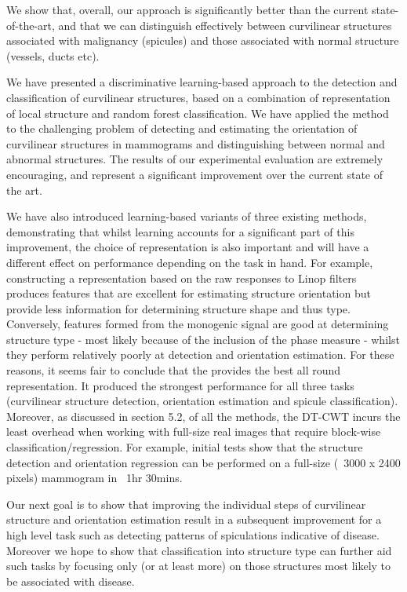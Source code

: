 We show that, overall, our approach is significantly better than the current state-of-the-art, and that we can distinguish effectively between curvilinear structures associated with malignancy (spicules) and those associated with normal structure (vessels, ducts etc).




We have presented a discriminative learning-based approach to the detection and classification of curvilinear structures, based on a combination of \dtcwt{} representation of local structure and random forest classification. We have applied the method to the challenging problem of detecting and estimating the orientation of curvilinear structures in mammograms and distinguishing between normal and abnormal structures. The results of our experimental evaluation are extremely encouraging, and represent a significant improvement over the current state of the art.

We have also introduced learning-based variants of three existing methods, demonstrating that whilst learning accounts for a significant part of this improvement, the choice of representation is also important and will have a different effect on performance depending on the task in hand. For example, constructing a representation based on the raw responses to Linop filters produces features that are excellent for estimating structure orientation but provide less information for determining structure shape and thus type. Conversely, features formed from the monogenic signal are good at determining structure type - most likely because of the inclusion of the phase measure - whilst they perform relatively poorly at detection and orientation estimation. For these reasons, it seems fair to conclude that the \dtcwt{} provides the best all round representation. It produced the strongest performance for all three tasks (curvilinear structure detection, orientation estimation and spicule classification). Moreover, as discussed in section 5.2, of all the methods, the DT-CWT incurs the least overhead when working with full-size real images that require block-wise classification/regression. For example, initial tests show that the structure detection and orientation regression can be performed on a full-size (~3000 x 2400 pixels) mammogram in ~1hr 30mins.

Our next goal is to show that improving the individual steps of curvilinear structure and orientation estimation result in a subsequent improvement for a high level task such as detecting patterns of spiculations indicative of disease. Moreover we hope to show that classification into structure type can further aid such tasks by focusing only (or at least more) on those structures most likely to be associated with disease. 
